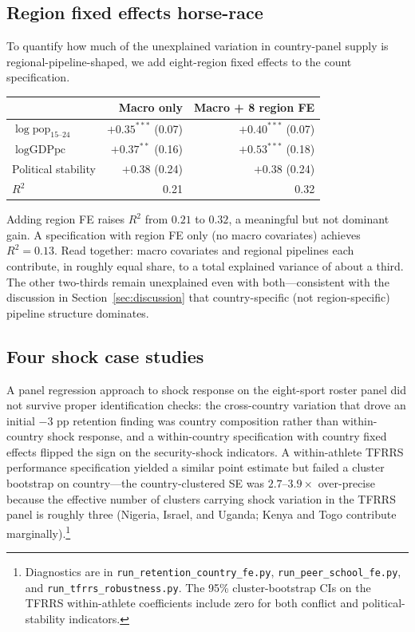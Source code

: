 \documentclass[11pt]{article}
\begin{document}
\subsection{Region fixed effects horse-race}
\label{sec:regions}

To quantify how much of the unexplained variation in country-panel
supply is regional-pipeline-shaped, we add eight-region fixed effects
to the count specification.

\begin{center}
\small
\begin{tabular}{lrr}
\toprule
                                  & Macro only & Macro + 8 region FE \\
\midrule
$\log\text{pop}_{15\text{--}24}$  & $+0.35^{***}$ (0.07) & $+0.40^{***}$ (0.07) \\
$\log\text{GDPpc}$                & $+0.37^{**}$ (0.16)  & $+0.53^{***}$ (0.18) \\
Political stability               & $+0.38$ (0.24)       & $+0.38$ (0.24) \\
\midrule
$R^2$                             & 0.21                 & 0.32 \\
\bottomrule
\end{tabular}
\end{center}

Adding region FE raises $R^2$ from $0.21$ to $0.32$, a meaningful but
not dominant gain. A specification with region FE only (no macro
covariates) achieves $R^2 = 0.13$. Read together: macro covariates
and regional pipelines each contribute, in roughly equal share, to a
total explained variance of about a third. The other two-thirds
remain unexplained even with both---consistent with the discussion
in Section~\ref{sec:discussion} that country-specific (not
region-specific) pipeline structure dominates.

\subsection{Four shock case studies}
\label{sec:case-studies}

A panel regression approach to shock response on the eight-sport
roster panel did not survive proper identification checks: the
cross-country variation that drove an initial $-3$ pp retention
finding was country composition rather than within-country shock
response, and a within-country specification with country fixed
effects flipped the sign on the security-shock indicators. A
within-athlete TFRRS performance specification yielded a similar
point estimate but failed a cluster bootstrap on country---the
country-clustered SE was $2.7$--$3.9 \times$ over-precise because
the effective number of clusters carrying shock variation in the
TFRRS panel is roughly three (Nigeria, Israel, and Uganda; Kenya
and Togo contribute marginally).\footnote{Diagnostics are in
\texttt{run\_retention\_country\_fe.py},
\texttt{run\_peer\_school\_fe.py}, and
\texttt{run\_tfrrs\_robustness.py}. The 95\% cluster-bootstrap CIs on
the TFRRS within-athlete coefficients include zero for both
conflict and political-stability indicators.}
\end{document}
